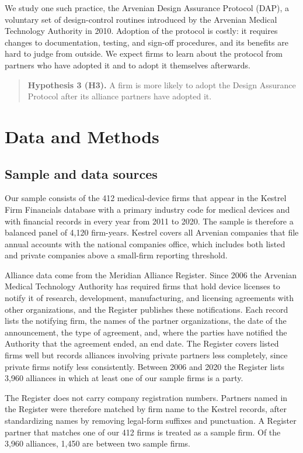 \documentclass[12pt]{article}
\begin{document}
We study one such practice, the Arvenian Design Assurance Protocol (DAP), a voluntary set of design-control routines introduced by the Arvenian Medical Technology Authority in 2010. Adoption of the protocol is costly: it requires changes to documentation, testing, and sign-off procedures, and its benefits are hard to judge from outside. We expect firms to learn about the protocol from partners who have adopted it and to adopt it themselves afterwards.

\begin{quote}
\textbf{Hypothesis 3 (H3).} A firm is more likely to adopt the Design Assurance Protocol after its alliance partners have adopted it.
\end{quote}

\section{Data and Methods}

\subsection{Sample and data sources}

Our sample consists of the 412 medical-device firms that appear in the Kestrel Firm Financials database with a primary industry code for medical devices and with financial records in every year from 2011 to 2020. The sample is therefore a balanced panel of 4,120 firm-years. Kestrel covers all Arvenian companies that file annual accounts with the national companies office, which includes both listed and private companies above a small-firm reporting threshold.

Alliance data come from the Meridian Alliance Register. Since 2006 the Arvenian Medical Technology Authority has required firms that hold device licenses to notify it of research, development, manufacturing, and licensing agreements with other organizations, and the Register publishes these notifications. Each record lists the notifying firm, the names of the partner organizations, the date of the announcement, the type of agreement, and, where the parties have notified the Authority that the agreement ended, an end date. The Register covers listed firms well but records alliances involving private partners less completely, since private firms notify less consistently. Between 2006 and 2020 the Register lists 3,960 alliances in which at least one of our sample firms is a party.

The Register does not carry company registration numbers. Partners named in the Register were therefore matched by firm name to the Kestrel records, after standardizing names by removing legal-form suffixes and punctuation. A Register partner that matches one of our 412 firms is treated as a sample firm. Of the 3,960 alliances, 1,450 are between two sample firms.
\end{document}
